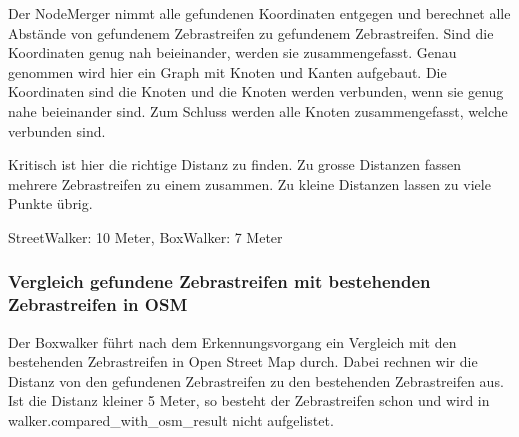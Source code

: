 Der NodeMerger nimmt alle gefundenen Koordinaten entgegen und berechnet alle Abstände von gefundenem Zebrastreifen zu gefundenem Zebrastreifen. Sind die Koordinaten genug nah beieinander, werden sie zusammengefasst. Genau genommen wird hier ein Graph mit Knoten und Kanten aufgebaut. Die Koordinaten sind die Knoten und die Knoten werden verbunden, wenn sie genug nahe beieinander sind. Zum Schluss werden alle Knoten zusammengefasst, welche verbunden sind.

Kritisch ist hier die richtige Distanz zu finden. Zu grosse Distanzen fassen mehrere Zebrastreifen zu einem zusammen. Zu kleine Distanzen lassen zu viele Punkte übrig.

 StreetWalker: 10 Meter, BoxWalker: 7 Meter

\subsubsection{Vergleich gefundene Zebrastreifen mit bestehenden Zebrastreifen in OSM}
Der Boxwalker führt nach dem Erkennungsvorgang ein Vergleich mit den bestehenden Zebrastreifen in Open Street Map durch. Dabei rechnen wir die Distanz von den gefundenen Zebrastreifen zu den bestehenden Zebrastreifen aus. Ist die Distanz kleiner 5 Meter, so besteht der Zebrastreifen schon und wird in walker.compared\_with\_osm\_result nicht aufgelistet.








